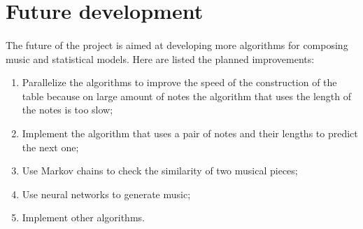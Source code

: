 \documentclass[]{article}
\begin{document}
        \newpage
    \section{Future development}
        \paragraph{}The future of the project is aimed at developing more algorithms for composing music and statistical models. Here are listed the planned improvements:
        \begin{enumerate}
            \item Parallelize the algorithms to improve the speed of the construction of the table because on large amount of notes the algorithm that uses the length of the notes is too slow;
            \item Implement the algorithm that uses a pair of notes and their lengths to predict the next one;
            \item Use Markov chains to check the similarity of two musical pieces;
            \item Use neural networks to generate music;
            \item Implement other algorithms.
        \end{enumerate}
\end{document}
